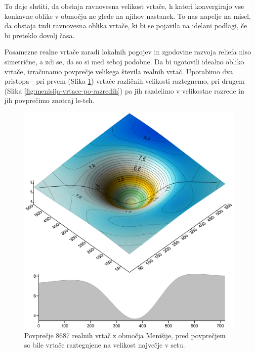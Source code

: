 \documentclass[a4paper, oneside, 12pt]{book}
\begin{document}
To daje slutiti, da obstaja ravnovesna velikost vrtače, h kateri konvergirajo vse konkavne oblike v območju ne glede na njihov nastanek.
To nas napelje na misel, da obstaja tudi ravnovesna oblika vrtače, ki bi se pojavila na idelani podlagi, če bi preteklo dovolj časa.

Posamezne realne vrtače zaradi lokalnih pogojev in zgodovine razvoja reliefa niso simetrične, a zdi se, da so si med seboj podobne. Da bi ugotovili idealno obliko vrtače, izračunamo povprečje velikega števila realnih vrtač. Uporabimo dva pristopa - pri prvem (Slika \ref{fig:menisija-vrtaca}) vrtače različnih velikosti raztegnemo, pri drugem (Slika \ref{fig:menisija-vrtace-po-razredih}) pa jih razdelimo v velikostne razrede in jih povprečimo znotraj le-teh. 

\begin{figure}[H]
  \centering
  \includegraphics[width=13cm]{slike/menisija-vrtaca}
  \caption{Povprečje 8687 realnih vrtač z območja Menišije, pred povprečjem so bile vrtače raztegnjene na velikost največje v setu.}
  \label{fig:menisija-vrtaca}
\end{figure}
\end{document}
